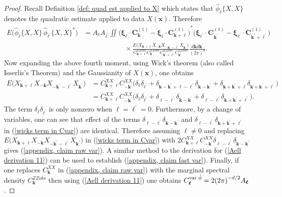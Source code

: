 \documentclass[10pt,noinfoline]{imsart}
\newcommand{\bs}{\boldsymbol}
\begin{document}
\begin{proof}
    Recall Definition \ref{def: quad est applied to X} which states that $\hat\phi_{\bs \ell}\{X,\!X\}$ denotes the quadratic estimate applied to data $X(\bs x)$. Therefore 
    \begin{align}
        E\big(\hat\phi_{\bs \ell}\{X,\!X\} \, \hat\phi_{\bs \ell^\prime}\{X,\!X\}^*\big)
        & = A_{\bs \ell}A_{\bs \ell^\prime}
        \iint
        {\Big(\bs\xi_{\bs \ell} \!\cdot\!\bs C^{{(1)}}_{\bs k} - \bs\xi_{\bs \ell} \!\cdot\!\bs C^{{(1)}}_{\bs k+\bs \ell}\Big)}^{\! *}
        {\Big(\bs\xi_{\bs \ell^\prime} \!\cdot\!\bs C^{{(1)}}_{\bs k^\prime} - \bs\xi_{\bs \ell^\prime} \!\cdot\!\bs C^{{(1)}}_{\bs k^\prime+\bs \ell^\prime}\Big)}^{}\nonumber\\
        &\qquad\qquad\qquad
        \times
        \frac{E\bigl(X_{\bs k+\bs \ell}X_{-\bs k}X_{-\bs k^\prime-\bs\ell^\prime}X_{\bs k^\prime}\bigr)}{C^{ZZobs}_{\bs k+\bs \ell}C^{ZZobs}_{\bs k}C^{ZZobs}_{\bs k^\prime+\bs \ell^\prime}C^{ZZobs}_{\bs k^\prime}}
        \frac{d\bs kd\bs k^\prime}{{(2\pi)}^{d}}.\label{wicks term in Cvar}
    \end{align}
    Now expanding the above fourth moment, using Wick's theorem (also called Isserlis's Theorem) \cite{wick1950evaluation, isserlis1916certain} and the Gaussianity of $X(\bs x)$, one obtains
    \begin{align*}
        E\bigl(X_{\bs k+\bs \ell}X_{-\bs k}X_{-\bs k^\prime-\bs\ell^\prime}X_{\bs k^\prime}\bigr)
        &=C^{X\!X}_{\bs k+\bs \ell}C^{X\!X}_{-\bs k^\prime}\bigl( \delta_{\bs\ell}\delta_{\bs\ell^\prime} +  \delta_{\bs k-\bs k^\prime + \bs \ell-\bs\ell^\prime}\delta_{\bs k-\bs k^\prime} +  \delta_{\bs k + \bs k^\prime +\bs\ell}\delta_{\bs k + \bs k^\prime +\bs\ell^\prime}   \bigr) \\
        &=C^{X\!X}_{\bs k+\bs\ell}C^{X\!X}_{-\bs k^\prime}\bigl( \delta_{\bs\ell}\delta_{\bs\ell^\prime} +  \delta_{ 
        \bs\ell-\bs\ell^\prime}\delta_{\bs k-\bs k^\prime} +  \delta_{\bs\ell-\bs\ell^\prime}\delta_{\bs k+\bs k^\prime +\bs\ell^\prime}   \bigr).
    \end{align*}
    The term $\delta_{\bs\ell}\delta_{\bs\ell^\prime}$ is only nonzero  when $\bs\ell=\bs\ell^\prime=0$. Furthermore, by a change of variables, one can see that effect of the terms $\delta_{ \bs\ell-\bs\ell^\prime}\delta_{\bs k-\bs k^\prime}$ and $ \delta_{\bs\ell-\bs\ell^\prime}\delta_{\bs k+\bs k^\prime +\bs \ell^\prime}$ in (\ref{wicks term in Cvar}) are identical. Therefore assuming $\bs \ell \neq 0$ and replacing  $E\bigl(X_{\bs k+\bs \ell}X_{-\bs k}X_{-\bs k^\prime-\bs\ell^\prime}X_{\bs k^\prime}\bigr)$ in (\ref{wicks term in Cvar}) with $2C^{X\!X}_{\bs k+\bs\ell}C^{X\!X}_{-\bs k^\prime}\delta_{ \bs\ell-\bs\ell^\prime}\delta_{\bs k-\bs k^\prime}$ gives (\ref{appendix, claim raw var}). A similar method to the derivation for (\ref{Aell derivation 11}) can be used to establish (\ref{appendix, claim fast var}). Finally, if one replaces $C^{X\!X}_{\bs k}$ in (\ref{appendix, claim raw var}) with the marginal spectral density $C^{ZZobs}_{\bs k}$ then using (\ref{Aell derivation 11}) one obtains $C_{\bs\ell}^{\text{\rm var }\hat{\phi}} =  2{(2\pi)}^{-d/2} A_{\bs\ell}$.

\end{proof}
\end{document}
